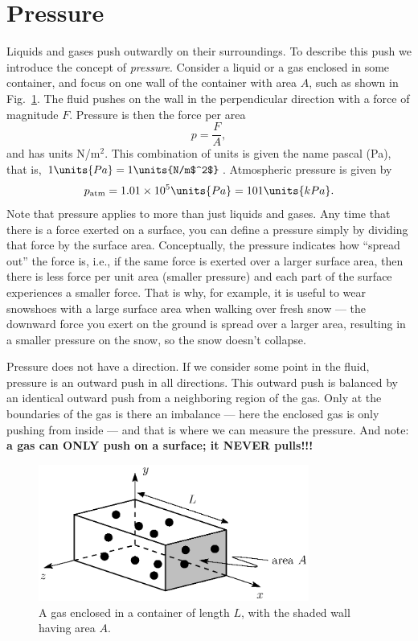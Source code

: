 \section{Pressure}

Liquids and gases push outwardly on their surroundings.  To describe
this push we introduce the concept of {\it pressure}.  Consider a
liquid or a gas enclosed in some container, and focus on one wall of
the container with area $A$, such as shown in
Fig.~\ref{fig:gas_pressure}.  The fluid pushes on the wall in the
perpendicular direction with a force of magnitude $F$.  Pressure is
then the force per area
\begin{equation}
  p=\frac{F}{A},
\end{equation}
and has units N/m$^2$.  This combination of units is given the name
pascal (Pa), that is, $1\units{Pa} = 1\units{N/m$^2$}$.  Atmospheric
pressure is given by
\begin{equation}
  p_\text{atm} = 1.01\times 10^{5} \units{Pa} = 101\units{kPa}.
\end{equation}
Note that pressure applies to more than just liquids and gases.  Any
time that there is a force exerted on a surface, you can define a
pressure simply by dividing that force by the surface area.
Conceptually, the pressure indicates how ``spread out'' the force is,
i.e., if the same force is exerted over a larger surface area, then
there is less force per unit area (smaller pressure) and each part of
the surface experiences a smaller force.  That is why, for example, it
is useful to wear snowshoes with a large surface area when walking
over fresh snow --- the downward force you exert on the ground is
spread over a larger area, resulting in a smaller pressure on the
snow, so the snow doesn't collapse.

Pressure does not have a direction.  If we consider some point in the
fluid, pressure is an outward push in all directions.  This outward
push is balanced by an identical outward push from a neighboring
region of the gas.  Only at the boundaries of the gas is there an
imbalance --- here the enclosed gas is only pushing from inside --- and
that is where we can measure the pressure.  And note:  {\bf a gas
can ONLY push on a surface; it NEVER pulls!!!}

\begin{figure}
\begin{center}
\includegraphics[width=3.5in]{liquids_and_gases/gas_pressure.eps}
\caption{A gas enclosed in a container of length $L$, with the shaded
wall having area $A$.}
\label{fig:gas_pressure}
\end{center}
\end{figure}

